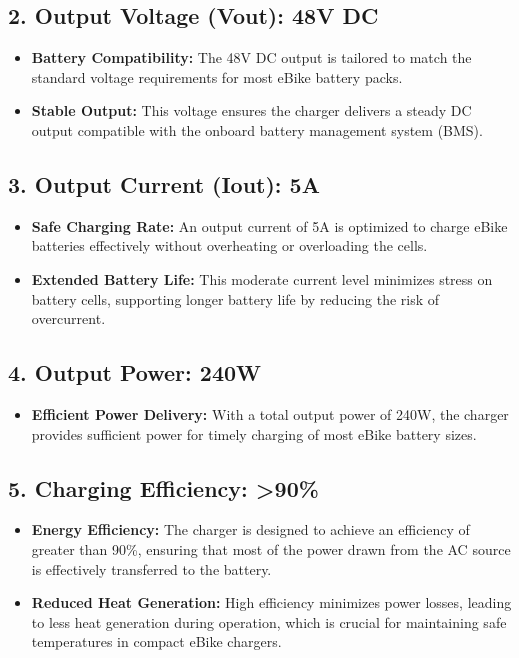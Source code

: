 \documentclass[12pt]{article}
\begin{document}
\subsection*{2. Output Voltage (Vout): 48V DC}
\begin{itemize}
    \item \textbf{Battery Compatibility:} The 48V DC output is tailored to match the standard voltage requirements for most eBike battery packs.
    \item \textbf{Stable Output:} This voltage ensures the charger delivers a steady DC output compatible with the onboard battery management system (BMS).
\end{itemize}

\subsection*{3. Output Current (Iout): 5A}
\begin{itemize}
    \item \textbf{Safe Charging Rate:} An output current of 5A is optimized to charge eBike batteries effectively without overheating or overloading the cells.
    \item \textbf{Extended Battery Life:} This moderate current level minimizes stress on battery cells, supporting longer battery life by reducing the risk of overcurrent.
\end{itemize}

\subsection*{4. Output Power: 240W}
\begin{itemize}
    \item \textbf{Efficient Power Delivery:} With a total output power of 240W, the charger provides sufficient power for timely charging of most eBike battery sizes.
\end{itemize}

\subsection*{5. Charging Efficiency: >90\%}
\begin{itemize}
    \item \textbf{Energy Efficiency:} The charger is designed to achieve an efficiency of greater than 90\%, ensuring that most of the power drawn from the AC source is effectively transferred to the battery.
    \item \textbf{Reduced Heat Generation:} High efficiency minimizes power losses, leading to less heat generation during operation, which is crucial for maintaining safe temperatures in compact eBike chargers.
\end{itemize}
\end{document}
